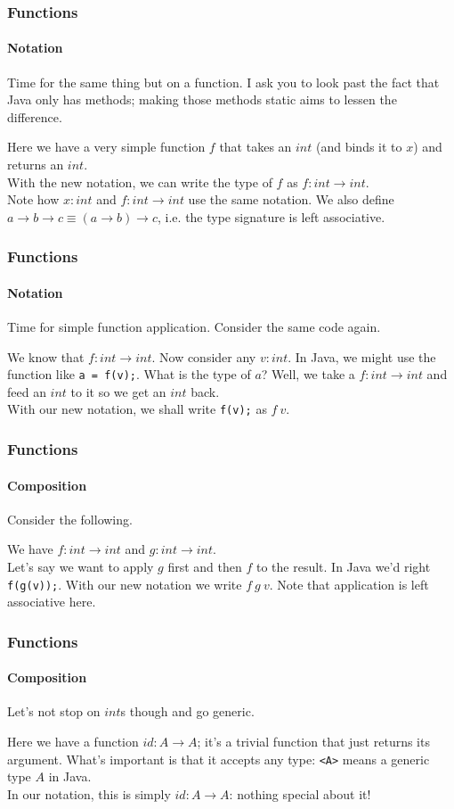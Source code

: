 \documentclass{beamer}
\begin{document}
\begin{frame}
  \frametitle{Functions}
  \framesubtitle{Notation}
  Time for the same thing but on a function. I ask you to look past
  the fact that Java only has methods; making those methods static
  aims to lessen the difference.
  \pause
  
  \pause
  Here we have a very simple function $f$ that takes an $int$ (and binds it to
  $x$) and returns an $int$.\\
  \pause
  With the new notation, we can write the type of $f$ as $f:int
  \rightarrow int$.\\
  \pause
  Note how $x:int$ and $f:int \rightarrow int$ use the same notation.
  \pause
  We also define $a \rightarrow b \rightarrow c \equiv (a
  \rightarrow b) \rightarrow c$, i.e. the type signature is left associative.
\end{frame}
\begin{frame}
  \frametitle{Functions}
  \framesubtitle{Notation}
  Time for simple function application. Consider the same code again.
  \pause
  
  \pause
  We know that $f:int \rightarrow int$. Now consider any $v:int$. In
  Java, we might use the function like \lstinline|a = f(v);|. What is
  the type of $a$? Well, we take a $f:int \rightarrow int$ and feed an
  $int$ to it so we get an $int$ back.\\
  \pause
  With our new notation, we shall write \lstinline|f(v);| as $f\:v$.\\

\end{frame}
\begin{frame}
  \frametitle{Functions}
  \framesubtitle{Composition}
  Consider the following.
  
  \pause
  We have $f:int \rightarrow int$ and $g:int \rightarrow int$.\\
  Let's say we want to apply $g$ first and then $f$ to the result. In Java
  we'd right \lstinline|f(g(v));|. With our new notation we write
  $f\:g\:v$. Note that application is left associative here.\\
\end{frame}
\begin{frame}
  \frametitle{Functions}
  \framesubtitle{Composition}
  Let's not stop on $int$s though and go generic.
  
  \pause
  Here we have a function $id:A \rightarrow A$; it's a trivial
  function that just returns its argument. What's important is that
  it accepts any type: \lstinline|<A>| means a generic type $A$ in
  Java.\\
  \pause
  In our notation, this is simply $id:A \rightarrow A$: nothing
  special about it!
\end{frame}
\end{document}
